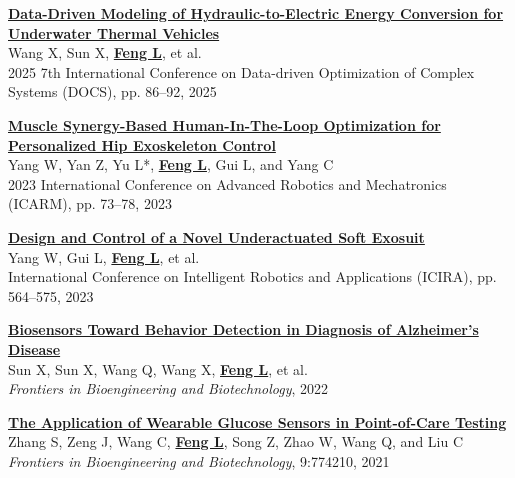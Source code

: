 \documentclass[a4paper,11pt]{article}
\begin{document}
{\begin{enumerate}[leftmargin=*, labelsep=0.5em, align=left, itemindent=0em, label={[\arabic*]}]
\item \href{https://ieeexplore.ieee.org/document/11200795}{\textbf{Data-Driven Modeling of Hydraulic-to-Electric Energy Conversion for Underwater Thermal Vehicles}}\\
Wang X, Sun X, \underline{\textbf{Feng L}}, et al.\\
2025 7th International Conference on Data-driven Optimization of Complex Systems (DOCS), pp. 86--92, 2025

\item \href{https://ieeexplore.ieee.org/document/10218406}{\textbf{Muscle Synergy-Based Human-In-The-Loop Optimization for Personalized Hip Exoskeleton Control}}\\
Yang W, Yan Z, Yu L*, \underline{\textbf{Feng L}}, Gui L, and Yang C\\
2023 International Conference on Advanced Robotics and Mechatronics (ICARM), pp. 73--78, 2023

\item \href{https://link.springer.com/chapter/10.1007/978-981-99-6489-5_46}{\textbf{Design and Control of a Novel Underactuated Soft Exosuit}}\\
Yang W, Gui L, \underline{\textbf{Feng L}}, et al.\\
International Conference on Intelligent Robotics and Applications (ICIRA), pp. 564--575, 2023

\item \href{https://www.frontiersin.org/journals/bioengineering-and-biotechnology/articles/10.3389/fbioe.2022.1031833/full}{\textbf{Biosensors Toward Behavior Detection in Diagnosis of Alzheimer's Disease}}\\
Sun X, Sun X, Wang Q, Wang X, \underline{\textbf{Feng L}}, et al.\\
\textit{Frontiers in Bioengineering and Biotechnology}, 2022

\item \href{https://doi.org/10.3389/fbioe.2021.774210}{\textbf{The Application of Wearable Glucose Sensors in Point-of-Care Testing}}\\
Zhang S, Zeng J, Wang C, \underline{\textbf{Feng L}}, Song Z, Zhao W, Wang Q, and Liu C\\
\textit{Frontiers in Bioengineering and Biotechnology}, 9:774210, 2021

\end{enumerate}
}
\vspace{1mm}
\end{document}
